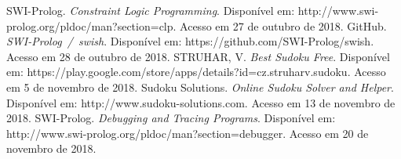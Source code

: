 \documentclass[journal,transmag]{IEEEtran}
\begin{document}



%
%


\ifCLASSOPTIONcaptionsoff
  \newpage
\fi





%
%
%
\begin{thebibliography}{1}

SWI-Prolog. \emph{Constraint Logic Programming}. Disponível em: http://www.swi-prolog.org/pldoc/man?section=clp. Acesso em 27 de outubro de 2018.
GitHub. \emph{SWI-Prolog~/~swish}. Disponível em: https://github.com/SWI-Prolog/swish. Acesso em 28 de outubro de 2018.
STRUHAR, V. \emph{Best Sudoku Free}. Disponível em: https://play.google.com/store/apps/details?id=cz.struharv.sudoku. Acesso em 5 de novembro de 2018.
Sudoku Solutions. \emph{Online Sudoku Solver and Helper}. Disponível em: http://www.sudoku-solutions.com. Acesso em 13 de novembro de 2018.
SWI-Prolog. \emph{Debugging and Tracing Programs}. Disponível em: http://www.swi-prolog.org/pldoc/man?section=debugger. Acesso em 20 de novembro de 2018.

\end{thebibliography}
\end{document}
